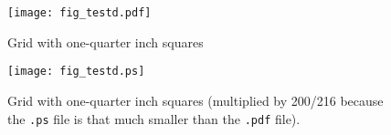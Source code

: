 \documentclass{article}
\begin{document}
\begin{figure}
\texttt{[image: fig\_testd.pdf]}
\caption{Grid with one-quarter inch squares}
\end{figure}

\begin{figure}
\texttt{[image: fig\_testd.ps]}
\caption{Grid with one-quarter inch squares (multiplied by 200/216
because the \texttt{.ps} file is that much smaller than the \texttt{.pdf}
file).}
\end{figure}
\end{document}
